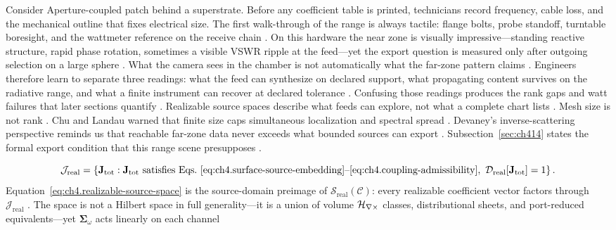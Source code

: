 \begin{physicalvignette}
Consider Aperture-coupled patch behind a superstrate. Before any coefficient table is printed, technicians record frequency, cable loss, and the mechanical outline that fixes electrical size. The first walk-through of the range is always tactile: flange bolts, probe standoff, turntable boresight, and the wattmeter reference on the receive chain \cite{hansen1988}.
On this hardware the near zone is visually impressive---standing reactive structure, rapid phase rotation, sometimes a visible VSWR ripple at the feed---yet the export question is measured only after outgoing selection on a large sphere \cite{harrington2001}. What the camera sees in the chamber is not automatically what the far-zone pattern claims \cite{stratton1941}.
Engineers therefore learn to separate three readings: what the feed can synthesize on declared support, what propagating content survives on the radiative range, and what a finite instrument can recover at declared tolerance \cite{devaney2004}. Confusing those readings produces the rank gaps and watt failures that later sections quantify \cite{pal2026}.
Realizable source spaces describe what feeds can explore, not what a complete chart lists . Mesh size is not rank .
Chu and Landau warned that finite size caps simultaneous localization and spectral spread \cite{chu1948}. Devaney's inverse-scattering perspective reminds us that reachable far-zone data never exceeds what bounded sources can export \cite{devaney2004}.
Subsection~\ref{sec:ch414} states the formal export condition that this range scene presupposes \cite{stratton1941}.
\end{physicalvignette}
\begin{equation}
\label{eq:ch4.realizable-source-space}
\mathcal{J}_{\mathrm{real}}
=
\left\{
\mathbf{J}_{\mathrm{tot}}:
\mathbf{J}_{\mathrm{tot}}\ \text{satisfies Eqs.~\eqref{eq:ch4.surface-source-embedding}--\eqref{eq:ch4.coupling-admissibility}},\
\mathcal{D}_{\mathrm{real}}[\mathbf{J}_{\mathrm{tot}}]=1
\right\}.
\end{equation}
Equation~\eqref{eq:ch4.realizable-source-space} is the source-domain preimage of
\(\mathcal{S}_{\mathrm{real}}(\mathcal{C})\): every realizable coefficient vector factors through
\(\mathcal{J}_{\mathrm{real}}\) \cite{stratton1941}. The space is not a Hilbert space in
full generality---it is a union of volume \(\mathcal{H}_{\nabla\times}\) classes, distributional sheets, and port-reduced
equivalents---yet \(\boldsymbol{\Sigma}_\omega\) acts linearly on each channel
